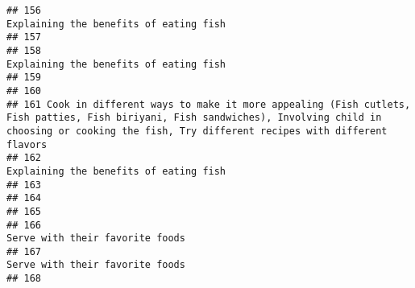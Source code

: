 \documentclass[
]{article}
\begin{document}
\begin{verbatim}
## 156                                                                                                                                                                       Explaining the benefits of eating fish
## 157                                                                                                                                                                                                             
## 158                                                                                                                                                                       Explaining the benefits of eating fish
## 159                                                                                                                                                                                                             
## 160                                                                                                                                                                                                             
## 161 Cook in different ways to make it more appealing (Fish cutlets, Fish patties, Fish biriyani, Fish sandwiches), Involving child in choosing or cooking the fish, Try different recipes with different flavors
## 162                                                                                                                                                                       Explaining the benefits of eating fish
## 163                                                                                                                                                                                                             
## 164                                                                                                                                                                                                             
## 165                                                                                                                                                                                                             
## 166                                                                                                                                                                              Serve with their favorite foods
## 167                                                                                                                                                                              Serve with their favorite foods
## 168                                                                                                                                                                                                             

\end{verbatim}
\end{document}
